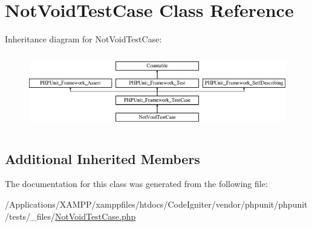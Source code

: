 \hypertarget{class_not_void_test_case}{}\section{Not\+Void\+Test\+Case Class Reference}
\label{class_not_void_test_case}
Inheritance diagram for Not\+Void\+Test\+Case\+:\begin{figure}[H]
\begin{center}
\leavevmode
\includegraphics[height=3.303835cm]{class_not_void_test_case}
\end{center}
\end{figure}
\subsection*{Additional Inherited Members}


The documentation for this class was generated from the following file\+:\begin{DoxyCompactItemize}
\item 
/\+Applications/\+X\+A\+M\+P\+P/xamppfiles/htdocs/\+Code\+Igniter/vendor/phpunit/phpunit/tests/\+\_\+files/\mbox{\hyperlink{_not_void_test_case_8php}{Not\+Void\+Test\+Case.\+php}}\end{DoxyCompactItemize}
